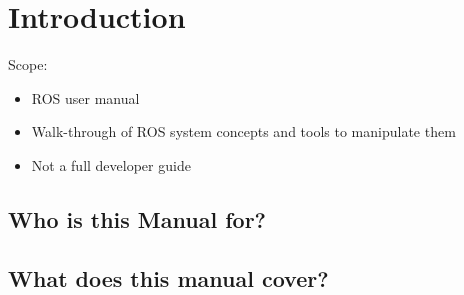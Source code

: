 \chapter {Introduction}
Scope:
\begin{itemize}
\item ROS user manual
\item Walk-through of ROS system concepts and tools to manipulate them 
\item Not a full developer guide
\end{itemize}
\section {Who is this Manual for?}
\section {What does this manual cover?}
\
